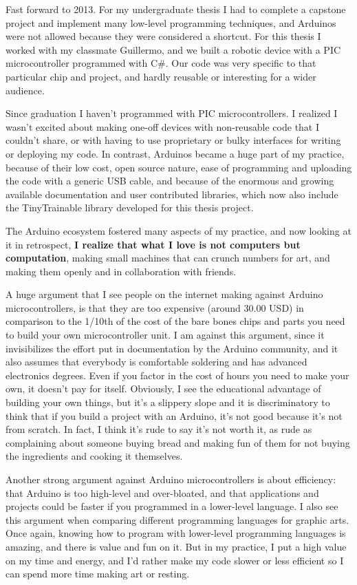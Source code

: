 Fast forward to 2013. For my undergraduate thesis I had to complete a capstone project and implement many low-level programming techniques, and Arduinos were not allowed because they were considered a shortcut. For this thesis I worked with my classmate Guillermo, and we built a robotic device with a \acrshort{PIC} microcontroller programmed with C\#. Our code was very specific to that particular chip and project, and hardly reusable or interesting for a wider audience.

Since graduation I haven't programmed with \acrshort{PIC} microcontrollers. I realized I wasn't excited about making one-off devices with non-reusable code that I couldn't share, or with having to use proprietary or bulky interfaces for writing or deploying my code. In contrast, Arduinos became a huge part of my practice, because of their low cost, open source nature, ease of programming and uploading the code with a generic USB cable, and because of the enormous and growing available documentation and user contributed libraries, which now also include the TinyTrainable library developed for this thesis project.

The Arduino ecosystem fostered many aspects of my practice, and now looking at it in retrospect, \textbf{I realize that what I love is not computers but computation}, making small machines that can crunch numbers for art, and making them openly and in collaboration with friends.

A huge argument that I see people on the internet making against Arduino microcontrollers, is that they are too expensive (around 30.00 USD) in comparison to the 1/10th of the cost of the bare bones chips and parts you need to build your own microcontroller unit. I am against this argument, since it invisibilizes the effort put in documentation by the Arduino community, and it also assumes that everybody is comfortable soldering and has advanced electronics degrees. Even if you factor in the cost of hours you need to make your own, it doesn't pay for itself. Obviously, I see the educational advantage of building your own things, but it's a slippery slope and it is discriminatory to think that if you build a project with an Arduino, it's not good because it's not from scratch. In fact, I think it's rude to say it's not worth it, as rude as complaining about someone buying bread and making fun of them for not buying the ingredients and cooking it themselves.

Another strong argument against Arduino microcontrollers is about efficiency: that Arduino is too high-level and over-bloated, and that applications and projects could be faster if you programmed in a lower-level language. I also see this argument when comparing different programming languages for graphic arts. Once again, knowing how to program with lower-level programming languages is amazing, and there is value and fun on it. But in my practice, I put a high value on my time and energy, and I'd rather make my code slower or less efficient so I can spend more time making art or resting.

